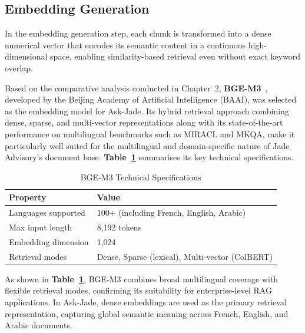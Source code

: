 \subsection{Embedding Generation}

In the embedding generation step, each chunk is transformed into a dense
numerical vector that encodes its semantic content in a continuous
high-dimensional space, enabling similarity-based retrieval even without
exact keyword overlap.

Based on the comparative analysis conducted in Chapter~2, \textbf{BGE-M3}~\cite{bge_m3},
developed by the Beijing Academy of Artificial Intelligence (BAAI), was
selected as the embedding model for Ask-Jade. Its hybrid retrieval approach combining dense, sparse, and multi-vector representations along with
its state-of-the-art performance on multilingual benchmarks such as MIRACL
and MKQA, make it particularly well suited for the multilingual and
domain-specific nature of Jade Advisory's document base.
\textbf{Table~\ref{tab:bge_m3_specs}} summarises its key technical specifications.

\begin{table}[H]
\centering
\caption{BGE-M3 Technical Specifications}
\label{tab:bge_m3_specs}
\renewcommand{\arraystretch}{1.4}
\begin{tabular}{|l|l|}
\hline
\textbf{Property} & \textbf{Value} \\
\hline
Languages supported & 100+ (including French, English, Arabic) \\
\hline
Max input length & 8{,}192 tokens \\
\hline
Embedding dimension & 1{,}024 \\
\hline
Retrieval modes & Dense, Sparse (lexical), Multi-vector (ColBERT) \\
\hline
\end{tabular}
\end{table}

As shown in \textbf{Table~\ref{tab:bge_m3_specs}}, BGE-M3 combines broad multilingual
coverage with flexible retrieval modes, confirming its suitability for
enterprise-level RAG applications. In Ask-Jade, dense embeddings are used
as the primary retrieval representation, capturing global semantic meaning
across French, English, and Arabic documents.











